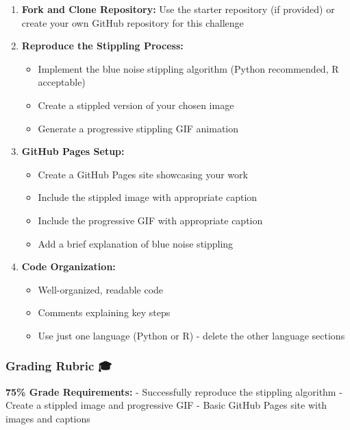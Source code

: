 \documentclass[
  letterpaper,
  DIV=11,
  numbers=noendperiod]{scrartcl}
\providecommand{\tightlist}{%
  \setlength{\itemsep}{0pt}\setlength{\parskip}{0pt}}
\begin{document}
\begin{enumerate}
\def\labelenumi{\arabic{enumi}.}
\item
  \textbf{Fork and Clone Repository:} Use the starter repository (if
  provided) or create your own GitHub repository for this challenge
\item
  \textbf{Reproduce the Stippling Process:}

  \begin{itemize}
  \tightlist
  \item
    Implement the blue noise stippling algorithm (Python recommended, R
    acceptable)
  \item
    Create a stippled version of your chosen image
  \item
    Generate a progressive stippling GIF animation
  \end{itemize}
\item
  \textbf{GitHub Pages Setup:}

  \begin{itemize}
  \tightlist
  \item
    Create a GitHub Pages site showcasing your work
  \item
    Include the stippled image with appropriate caption
  \item
    Include the progressive GIF with appropriate caption
  \item
    Add a brief explanation of blue noise stippling
  \end{itemize}
\item
  \textbf{Code Organization:}

  \begin{itemize}
  \tightlist
  \item
    Well-organized, readable code
  \item
    Comments explaining key steps
  \item
    Use just one language (Python or R) - delete the other language
    sections
  \end{itemize}
\end{enumerate}

\subsubsection{Grading Rubric 🎓}\label{grading-rubric}

\textbf{75\% Grade Requirements:} - Successfully reproduce the stippling
algorithm - Create a stippled image and progressive GIF - Basic GitHub
Pages site with images and captions
\end{document}
